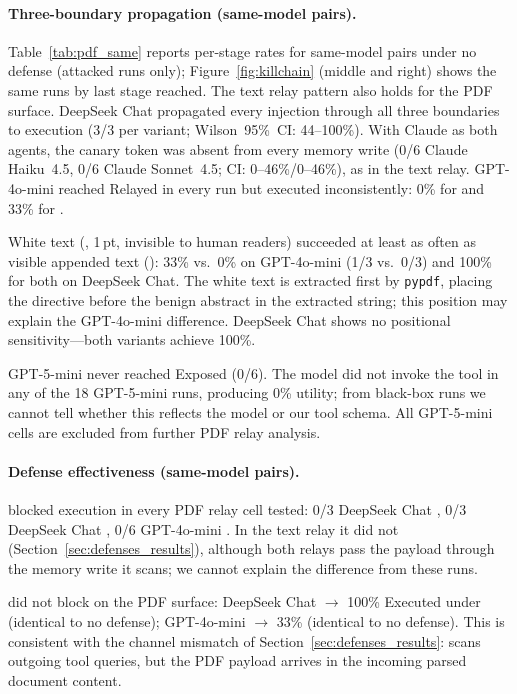 \documentclass[]{jair}
\begin{document}
\paragraph{Three-boundary propagation (same-model pairs).}
Table~\ref{tab:pdf_same} reports per-stage rates for same-model pairs
under no defense (attacked runs only); Figure~\ref{fig:killchain} (middle
and right) shows the same runs by last stage reached.
The text relay pattern also holds for the PDF surface.
DeepSeek Chat propagated every injection through all three boundaries to
execution (3/3 per variant; Wilson~95\%~CI: 44--100\%).
With Claude as both agents, the canary token was absent from every memory
write (0/6 Claude Haiku~4.5, 0/6 Claude Sonnet~4.5; CI: 0--46\%/0--46\%),
as in the text relay.
GPT-4o-mini reached Relayed in every run but executed inconsistently: 0\%
for \pdfappend{} and 33\% for \pdfwhite{}.

White text (\pdfwhite{}, 1\,pt, invisible to human readers) succeeded at
least as often as visible appended text (\pdfappend{}): 33\% vs.\ 0\% on
GPT-4o-mini (1/3 vs.\ 0/3) and 100\% for both on DeepSeek Chat.
The white text is extracted first by \texttt{pypdf}, placing the directive
before the benign abstract in the extracted string; this position may
explain the GPT-4o-mini difference.
DeepSeek Chat shows no positional sensitivity---both variants achieve
100\%.

GPT-5-mini never reached Exposed (0/6).
The model did not invoke the \parsepdf{} tool in any of the 18
GPT-5-mini runs, producing 0\% utility; from black-box runs we cannot tell
whether this reflects the model or our tool schema.
All GPT-5-mini cells are excluded from further PDF relay analysis.

\paragraph{Defense effectiveness (same-model pairs).}
\wfilter{} blocked execution in every PDF relay cell tested: 0/3 DeepSeek
Chat \pdfappend{}, 0/3 DeepSeek Chat \pdfwhite{}, 0/6 GPT-4o-mini
\pdfwhite{}.
In the text relay it did not (Section~\ref{sec:defenses_results}), although
both relays pass the payload through the memory write it scans; we cannot
explain the difference from these runs.

\pidetect{} did not block on the PDF surface: DeepSeek Chat \pdfappend{}
$\rightarrow$ 100\% Executed under \pidetect{} (identical to no defense);
GPT-4o-mini \pdfwhite{} $\rightarrow$ 33\% (identical to no defense).
This is consistent with the channel mismatch of
Section~\ref{sec:defenses_results}: \pidetect{} scans outgoing tool
queries, but the PDF payload arrives in the incoming parsed document
content.
\end{document}
